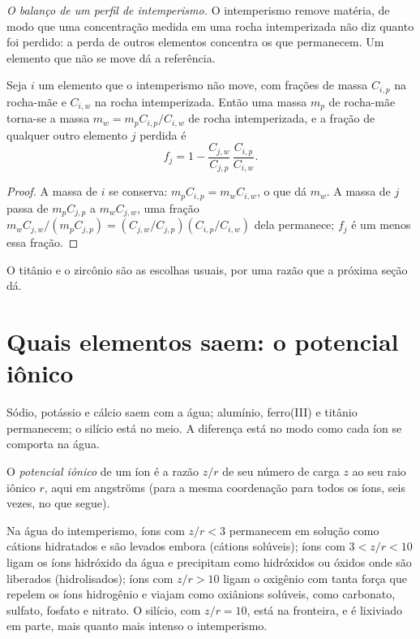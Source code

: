 \emph{O balanço de um perfil de intemperismo.} O intemperismo remove matéria, de modo que uma concentração medida em uma rocha intemperizada não diz quanto foi perdido: a perda de outros elementos concentra os que permanecem. Um elemento que não se move dá a referência.

\begin{proposition}\label{prop:b1:weathering-clays:immobile}
Seja $i$ um elemento que o intemperismo não move, com frações de massa $C_{i,p}$ na rocha-mãe e $C_{i,w}$ na rocha intemperizada. Então uma massa $m_p$ de rocha-mãe torna-se a massa $m_w = m_p C_{i,p}/C_{i,w}$ de rocha intemperizada, e a fração de qualquer outro elemento $j$ perdida é
\[
  f_j = 1 - \frac{C_{j,w}}{C_{j,p}}\,\frac{C_{i,p}}{C_{i,w}} .
\]
\end{proposition}

\begin{proof}
A massa de $i$ se conserva: $m_p C_{i,p} = m_w C_{i,w}$, o que dá $m_w$. A massa de $j$ passa de $m_p C_{j,p}$ a $m_w C_{j,w}$, uma fração
$m_w C_{j,w}/(m_p C_{j,p}) = (C_{j,w}/C_{j,p})(C_{i,p}/C_{i,w})$ dela permanece; $f_j$ é um menos essa fração.
\end{proof}

O titânio e o zircônio são as escolhas usuais, por uma razão que a próxima seção dá.

\section{Quais elementos saem: o potencial iônico}\label{sec:b1:weathering-clays:ionic}

Sódio, potássio e cálcio saem com a água; alumínio, ferro(III) e titânio permanecem; o silício está no meio. A diferença está no modo como cada íon se comporta na água.

\begin{definition}\label{def:b1:weathering-clays:ionic-potential}
O \emph{potencial iônico} de um íon é a razão $z/r$ de seu número de carga $z$ ao seu raio iônico $r$, aqui em angströms (para a mesma coordenação para todos os íons, seis vezes, no que segue).
\end{definition}

\begin{proposition}\label{prop:b1:weathering-clays:fields}
Na água do intemperismo, íons com $z/r < 3$ permanecem em solução como cátions hidratados e são levados embora (cátions solúveis); íons com $3 < z/r < 10$ ligam os íons hidróxido da água e precipitam como hidróxidos ou óxidos onde são liberados (hidrolisados); íons com $z/r > 10$ ligam o oxigênio com tanta força que repelem os íons hidrogênio e viajam como oxiânions solúveis, como carbonato, sulfato, fosfato e nitrato. O silício, com $z/r = 10$, está na fronteira, e é lixiviado em parte, mais quanto mais intenso o intemperismo.
\end{proposition}
\admitted

